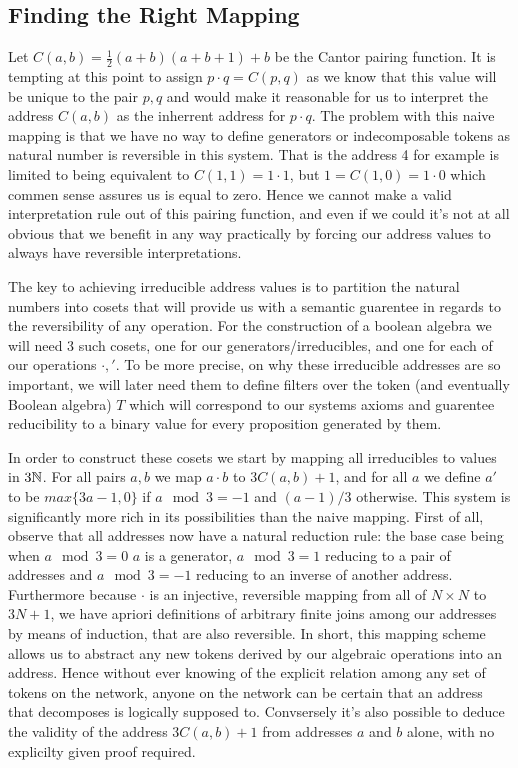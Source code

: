\documentclass[12pt]{amsart}
\begin{document}
\subsection{Finding the Right Mapping}
Let $C(a,b) = \frac{1}{2} (a + b)(a + b + 1) + b$ be the Cantor pairing function. It is tempting at this point to assign $p\cdot q = C(p,q)$ as we know that this value will be unique to the pair $p,q$ and would make it reasonable for us to interpret the address $C(a,b)$ as the inherrent address for $p\cdot q$. The problem with this naive mapping is that we have no way to define generators or indecomposable tokens as  natural number is reversible in this system. That is the address 4 for example is limited to being equivalent to $C(1,1) = 1\cdot 1$, but $1 = C(1,0) = 1\cdot 0$ which commen sense assures us is equal to zero. Hence we cannot make a valid interpretation rule out of this pairing function, and even if we could it's not at all obvious that we benefit in any way practically by forcing our address values to always have reversible interpretations.

The key to achieving irreducible address values is to partition the natural numbers into cosets that will provide us with a semantic guarentee in regards to the reversibility of any operation. For the construction of a boolean algebra we will need 3 such cosets, one for our generators/irreducibles, and one for each of our operations $\cdot,' $. To be more precise, on why these irreducible addresses are so important, we will later need them to define filters over the token (and eventually Boolean algebra) $T$ which will correspond to our systems axioms and guarentee reducibility to a binary value for every proposition generated by them.

In order to construct these cosets we start by mapping all irreducibles to values in $3\mathbb{N}$. For all pairs $a,b$ we map $a\cdot b$ to $3C(a,b) + 1$, and for all $a$ we define $a'$ to be $max\{3a - 1,0\}$ if $a\mod 3 = -1$ and $(a-1)/3$ otherwise. This system is significantly more rich in its possibilities than the naive mapping. First of all, observe that all addresses now have a natural reduction rule: the base case being when $a\mod 3 = 0$ $a$ is a generator, $a\mod 3 = 1$ reducing to a pair of addresses and $a\mod 3 = - 1$ reducing to an inverse of another address. Furthermore because $\cdot$ is an injective, reversible mapping from all of $N\times N$ to $3N + 1$, we have apriori definitions of arbitrary finite joins among our addresses by means of induction, that are also reversible. In short, this mapping scheme allows us to abstract any new tokens derived by our algebraic operations into an address. Hence without ever knowing of the explicit relation among any set of tokens on the network, anyone on the network can be certain that an address that decomposes is logically supposed to. Convsersely it's also possible to deduce the validity of the address $3C(a,b) + 1$ from addresses $a$ and $b$ alone, with no explicilty given proof required.
\end{document}
